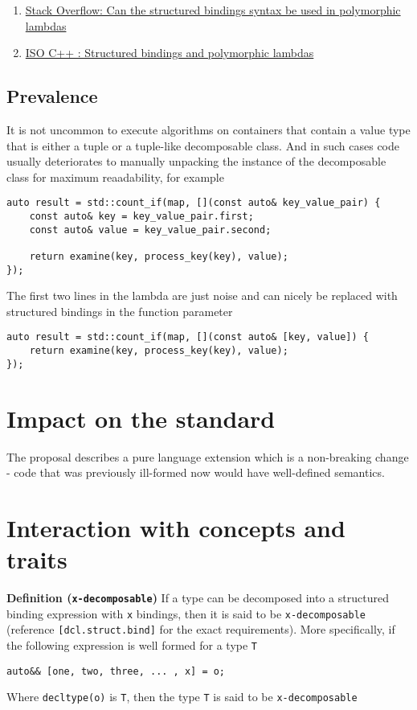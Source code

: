 \documentclass{article}
\begin{document}
\begin{enumerate}
    \item \href{https://stackoverflow.com/questions/45541334}{Stack Overflow:
        Can the structured bindings syntax be used in polymorphic lambdas}
    \item \href{https://goo.gl/fRSwNg}{ISO C++ : Structured bindings and
        polymorphic lambdas}
\end{enumerate}

\subsection{Prevalence}
It is not uncommon to execute algorithms on containers that contain a value
type that is either a tuple or a tuple-like decomposable class.  And in such
cases code usually deteriorates to manually unpacking the instance of the
decomposable class for maximum reaadability, for example

\begin{lstlisting}
auto result = std::count_if(map, [](const auto& key_value_pair) {
    const auto& key = key_value_pair.first;
    const auto& value = key_value_pair.second;

    return examine(key, process_key(key), value);
});
\end{lstlisting}

The first two lines in the lambda are just noise and can nicely be replaced
with structured bindings in the function parameter

\begin{lstlisting}
auto result = std::count_if(map, [](const auto& [key, value]) {
    return examine(key, process_key(key), value);
});
\end{lstlisting}


\section{Impact on the standard}
The proposal describes a pure language extension which is a non-breaking
change - code that was previously ill-formed now would have well-defined
semantics.


\section{Interaction with concepts and traits}
\textbf{Definition (\texttt{x-decomposable})} If a type can be decomposed into
a structured binding expression with \texttt{x} bindings, then it is said to
be \texttt{x-decomposable} (reference \texttt{[dcl.struct.bind]} for the exact
requirements).  More specifically, if the following expression is well formed
for a type \texttt{T}
\begin{lstlisting}
auto&& [one, two, three, ... , x] = o;
\end{lstlisting}
Where \texttt{decltype(o)} is \texttt{T}, then the type \texttt{T} is said to
be \texttt{x-decomposable}
\end{document}
